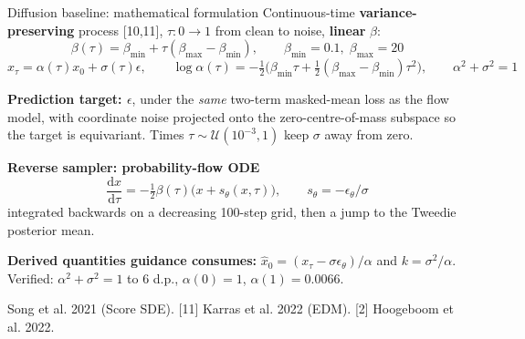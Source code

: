 \documentclass[aspectratio=169,10pt]{beamer}
\newcommand{\theslidelabel}{}
\newcommand{\lbl}[1]{\renewcommand{\theslidelabel}{#1}}
\newcommand{\srcs}[1]{\vfill{\raggedleft\color{grayt}\fontsize{4.9}{5.6}\selectfont #1\par}}
\begin{document}
\lbl{1d}
\begin{frame}{Diffusion baseline: mathematical formulation}
  Continuous-time \textbf{variance-preserving} process [10,11], $\tau:0\to1$ from
  clean to noise, \textbf{linear} $\beta$:
  \[ \beta(\tau)=\beta_{\min}+\tau(\beta_{\max}-\beta_{\min}),\qquad
     \beta_{\min}=0.1,\;\beta_{\max}=20 \]
  \[ x_\tau=\alpha(\tau)x_0+\sigma(\tau)\epsilon,\qquad
     \log\alpha(\tau)=-\tfrac12\Big(\beta_{\min}\tau+\tfrac12(\beta_{\max}-\beta_{\min})\tau^2\Big),
     \qquad \alpha^2+\sigma^2=1 \]

  \textbf{Prediction target: $\epsilon$}, under the \emph{same} two-term masked-mean
  loss as the flow model, with coordinate noise projected onto the
  zero-centre-of-mass subspace so the target is equivariant. Times
  $\tau\sim\mathcal{U}(10^{-3},1)$ keep $\sigma$ away from zero.

  \medskip
  \textbf{Reverse sampler: probability-flow ODE}
  \[ \frac{\mathrm{d}x}{\mathrm{d}\tau}=-\tfrac12\beta(\tau)\big(x+s_\theta(x,\tau)\big),
     \qquad s_\theta=-\epsilon_\theta/\sigma \]
  integrated backwards on a decreasing 100-step grid, then a jump to the Tweedie
  posterior mean.

  \medskip
  \textbf{Derived quantities guidance consumes:}
  $\hat{x}_0=(x_\tau-\sigma\epsilon_\theta)/\alpha$ and $k=\sigma^2/\alpha$.
  Verified: $\alpha^2+\sigma^2=1$ to 6 d.p., $\alpha(0)=1$, $\alpha(1)=0.0066$.

  \srcs{[10] Song et al. 2021 (Score SDE). [11] Karras et al. 2022 (EDM).
        [2] Hoogeboom et al. 2022.}
\end{frame}
\end{document}
